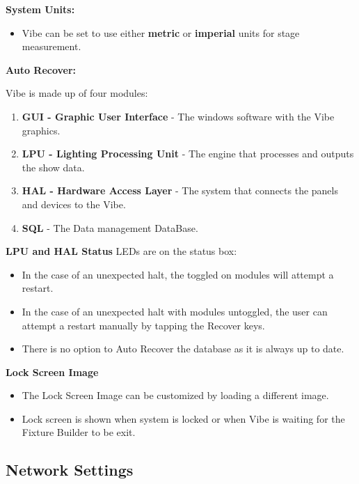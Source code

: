 \documentclass[
]{article}
\providecommand{\tightlist}{%
  \setlength{\itemsep}{0pt}\setlength{\parskip}{0pt}}
\begin{document}
\textbf{System Units:}

\begin{itemize}
\tightlist
\item
  Vibe can be set to use either \textbf{metric} or \textbf{imperial} units for stage measurement.
\end{itemize}

\textbf{Auto Recover:}

Vibe is made up of four modules:

\begin{enumerate}
\def\labelenumi{\arabic{enumi}.}
\item
  \textbf{GUI - Graphic User Interface} - The windows software with the Vibe graphics.
\item
  \textbf{LPU - Lighting Processing Unit} - The engine that processes and outputs the show data.
\item
  \textbf{HAL - Hardware Access Layer} - The system that connects the panels and devices to the Vibe.
\item
  \textbf{SQL} - The Data management DataBase.
\end{enumerate}

\textbf{LPU and HAL Status} LEDs are on the status box:

\begin{itemize}
\item
  In the case of an unexpected halt, the toggled on modules will attempt a restart.
\item
  In the case of an unexpected halt with modules untoggled, the user can attempt a restart manually by tapping the Recover keys.
\item
  There is no option to Auto Recover the database as it is always up to date.
\end{itemize}

\textbf{Lock Screen Image}

\begin{itemize}
\item
  The Lock Screen Image can be customized by loading a different image.
\item
  Lock screen is shown when system is locked or when Vibe is waiting for the Fixture Builder to be exit.
\end{itemize}

\hypertarget{Network-Settings-4.2}{%
\subsection{Network Settings}\label{Network-Settings-4.2}}
\end{document}
